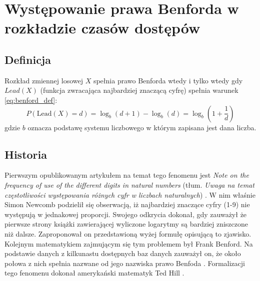 \section{Występowanie prawa Benforda w rozkładzie czasów dostępów}
\subsection{Definicja}
Rozkład zmiennej losowej $X$ spełnia prawo Benforda wtedy i tylko wtedy gdy $Lead(X)$ (funkcja zwracająca najbardziej znaczącą cyfrę) spełnia warunek \ref{eq:benford_def}:
\begin{equation}
    \label{eq:benford_def}
    P(\textrm{Lead}(X) = d) = \log_b(d+1)-\log_b(d) = \log_b\left(1+\frac{1}{d}\right)
\end{equation}
gdzie $b$ oznacza podstawę systemu liczbowego w którym zapisana jest dana liczba.
\subsection{Historia}
Pierwszym opublikowanym artykułem na temat tego fenomenu jest \emph{Note on the frequency of use of the different digits in natural numbers} (tłum. \emph{Uwaga na temat częstotliwości występowania różnych cyfr w liczbach naturalnych}) \cite{first_benford}. W nim właśnie Simon Newcomb podzielił się obserwacją, iż najbardziej znaczące cyfry (1-9) nie występują w jednakowej proporcji. Swojego odkrycia dokonał, gdy zauważył że pierwsze strony książki zawierającej wyliczone logarytmy są bardziej  zniszczone niż dalsze. Zaproponował on przedstawioną wyżej formułę opisującą to zjawisko. Kolejnym matematykiem zajmującym się tym problemem był Frank Benford. Na podstawie danych z kilkunastu dostępnych baz danych zauważył on, że około połowa z nich spełnia nazwane od jego nazwiska prawo Benfoda \cite{benford}. Formalizacji tego fenomenu dokonał amerykański matematyk Ted Hill \cite{hill}.
